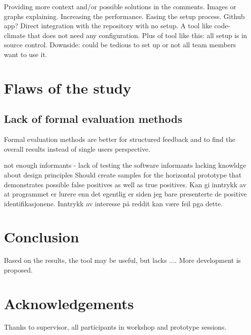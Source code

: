 \documentclass{report}
\begin{document}
Providing more context and/or possible solutions in the comments. Images or graphs explaining.
Increasing the performance.
Easing the setup process. Github app? Direct integration with the repository with no setup. A tool like code-climate that does not need any configuration. Plus of tool like this: all setup is in source control. Downside: could be tedious to set up or not all team members want to use it.
\section{Flaws of the study}
\label{flaws-of-study}
\subsection{Lack of formal evaluation methods}
Formal evaluation methods are better for structured feedback and to find the overall results instead of single users perspective. 

not enough informants - lack of testing the software
informants lacking knowldge about design principles
Should create samples for the horizontal prototype that demonstrates possible false positives as well as true positives. Kan gi inntrykk av at programmet er lurere enn det egentlig er siden jeg bare presenterte de positive identifikasjonene. Inntrykk av interesse på reddit kan være feil pga dette.

\section{Conclusion}
\label{conclusion}
Based on the results, the tool may be useful, but lacks .... More development is proposed.

\section{Acknowledgements}
\label{acknowledgements}
Thanks to supervisor, all participants in workshop and prototype sessions.

\printbibliography

\appendix
\label{appendix}

\end{document}
